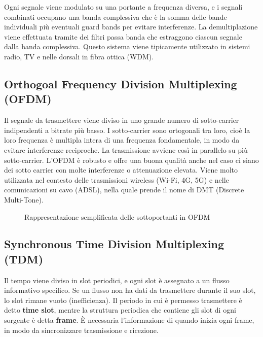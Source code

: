 Ogni segnale viene modulato su una portante a frequenza diversa, e i segnali combinati occupano una banda complessiva che è la somma delle bande individuali più eventuali guard bands per evitare interferenze.
La demultiplazione viene effettuata tramite dei filtri passa banda che estraggono ciascun segnale dalla banda complessiva.
Questo sistema viene tipicamente utilizzato in sistemi radio, TV e nelle dorsali in fibra ottica (WDM).
\subsection{Orthogoal Frequency Division Multiplexing (OFDM)}
Il segnale da trasmettere viene diviso in uno grande numero di sotto-carrier indipendenti a bitrate più basso.
I sotto-carrier sono ortogonali tra loro, cioè la loro frequenza è multipla intera di una frequenza fondamentale, in modo da evitare interferenze reciproche.
La trasmissione avviene così in parallelo su più sotto-carrier. L'OFDM è robusto e offre una buona qualità anche nel caso ci siano dei sotto carrier con molte interferenze o attenuazione elevata.
Viene molto utilizzata nel contesto delle trasmissioni wireless (Wi-Fi, 4G, 5G) e nelle comunicazioni su cavo (ADSL), nella quale prende il nome di DMT (Discrete Multi-Tone).

\begin{figure}[H]
\centering
{}
\caption{Rappresentazione semplificata delle sottoportanti in OFDM}
\end{figure}
\subsection{Synchronous Time Division Multiplexing (TDM)}
Il tempo viene diviso in slot periodici, e ogni slot è assegnato a un flusso informativo specifico. Se un flusso non ha dati da trasmettere durante il suo slot, lo slot rimane vuoto (inefficienza).
Il periodo in cui è permesso trasmettere è detto \textbf{time slot}, mentre la struttura periodica che contiene gli slot di ogni sorgente è detta \textbf{frame}.
È necessaria l'informazione di quando inizia ogni frame, in modo da sincronizzare trasmissione e ricezione.

